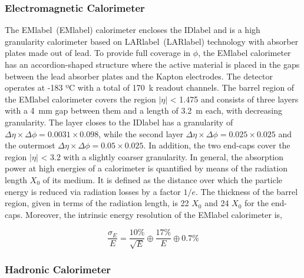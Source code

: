 
\subsubsection*{Electromagnetic Calorimeter}

The \acrlong{EMlabel}~(\acrshort{EMlabel}) calorimeter encloses the \acrshort{IDlabel} and is a high granularity calorimeter based on \acrlong{LARlabel}~(\acrshort{LARlabel}) technology with absorber plates made out of lead. To provide full coverage in $\phi$, the \acrshort{EMlabel} calorimeter has an accordion-shaped structure where the active material is placed in the gaps between the lead absorber plates and the Kapton electrodes. The detector operates at -183 ºC with a total of 170~k readout channels. The barrel region of the \acrshort{EMlabel} calorimeter covers the region $|\eta|$ < 1.475 and consists of three layers with a 4~mm gap between them and a length of 3.2~m each, with decreasing granularity. The layer closes to the \acrshort{IDlabel} has a granularity of $\Delta\eta\times\Delta\phi= 0.0031\times 0.098$, while the second layer $\Delta\eta\times\Delta\phi= 0.025\times 0.025$ and the outermost $\Delta\eta\times\Delta\phi= 0.05\times 0.025$. In addition, the two end-caps cover the region $|\eta|$ < 3.2 with a slightly coarser granularity. In general, the absorption power at high energies of a calorimeter is quantified by means of the radiation length $X_0$ of its medium. It is defined as the distance over which the particle energy is reduced via radiation losses by a factor $1/e$. The thickness of the barrel region, given in terms of the radiation length, is 22 $X_0$ and 24 $X_0$ for the end-caps. Moreover, the intrinsic energy resolution of the \acrshort{EMlabel} calorimeter is,

\begin{equation}
    \frac{\sigma_E}{E} = \frac{10\%}{\sqrt{E}}\oplus\frac{17\%}{E}\oplus 0.7\%
\end{equation}


\subsubsection*{Hadronic Calorimeter}

